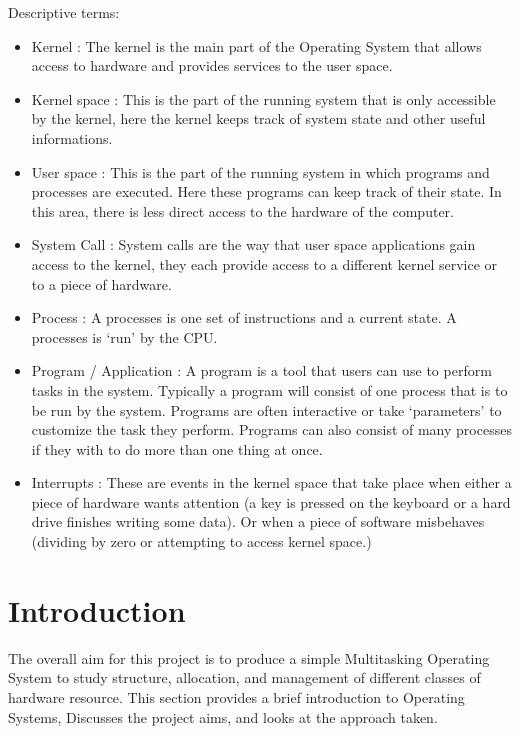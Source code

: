 \documentclass[a4paper]{report}
\begin{document}
\begin{minipage}{.5\textwidth}
  \centering
  Descriptive terms:
  \begin{itemize}
  \item Kernel : The kernel is the main part of the Operating System that allows access to hardware and provides services to the user space.
  \item Kernel space : This is the part of the running system that is only accessible by the kernel, here the kernel keeps track of system state and other useful informations.
  \item User space : This is the part of the running system in which programs and processes are executed. Here these programs can keep track of their state. In this area, there is less direct access to the hardware of the computer.
  \item System Call : System calls are the way that user space applications gain access to the kernel, they each provide access to a different kernel service or to a piece of hardware.
  \item Process : A processes is one set of instructions and a current state. A processes is `run' by the CPU.
  \item Program / Application : A program is a tool that users can use to perform tasks in the system. Typically a program will consist of one process that is to be run by the system. Programs are often interactive or take `parameters' to customize the task they perform. Programs can also consist of many processes if they with to do more than one thing at once.
  \item Interrupts : These are events in the kernel space that take place when either a piece of hardware wants attention (a key is pressed on the keyboard or a hard drive finishes writing some data). Or when a piece of software misbehaves (dividing by zero or attempting to access kernel space.)
  \end{itemize}
\end{minipage}


\clearpage


\chapter{Introduction}

The overall aim for this project is to produce a simple Multitasking Operating System to study structure, allocation, and management of different classes of hardware resource. This section provides a brief introduction to Operating Systems, Discusses the project aims, and looks at the approach taken.
\end{document}
